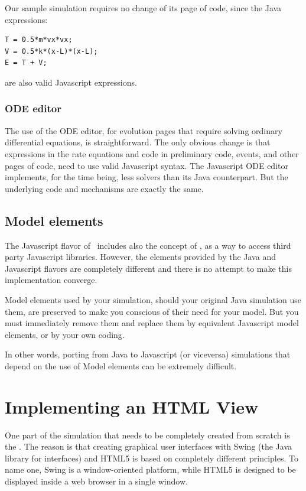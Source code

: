 Our sample simulation requires no change of its  page of code, since the Java expressions:
\begin{verbatim}
T = 0.5*m*vx*vx;
V = 0.5*k*(x-L)*(x-L);
E = T + V;
\end{verbatim}
\noindent are also valid Javascript expressions.

\subsubsection*{ODE editor}

The use of the ODE editor, for evolution pages that require solving ordinary differential equations, is straightforward. The only obvious change is that expressions in the rate equations and code in preliminary code, events, and other pages of code, need to use valid Javascript syntax. The Javascript ODE editor implements, for the time being, less solvers than its Java counterpart. But the underlying code and mechanisms are exactly the same.

\subsection{Model elements}

The Javascript flavor of \ejs\ includes also the concept of , as a way to access third party Javascript libraries. However, the elements provided by the Java and Javascript flavors are completely different and there is no attempt to make this implementation converge.

Model elements used by your simulation, should your original Java simulation use them, are preserved to make you conscious of their need for your model. But you must immediately remove them and replace them by equivalent Javascript model elements, or by your own coding. 

In other words, porting from Java to Javascript (or viceversa) simulations that depend on the use of Model elements can be extremely difficult.

    \section{Implementing an HTML View}\label{section:04View}

One part of the simulation that needs to be completely created from scratch is the . The reason is that creating graphical user interfaces with Swing (the Java library for interfaces) and HTML5 is based on completely different principles. To name one, Swing is a window-oriented platform, while HTML5 is designed to be displayed inside a web browser in a single window.

